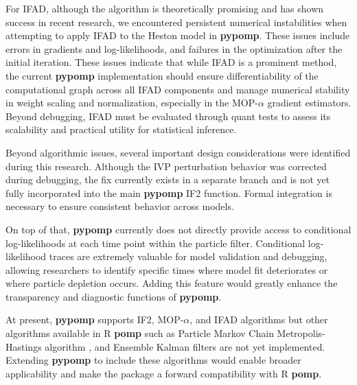 \documentclass[11pt]{report}
\begin{document}
For IFAD, although the algorithm is theoretically promising and has shown success in recent research, we encountered persistent numerical instabilities when attempting to apply IFAD to the Heston model in \textbf{pypomp}. These issues include errors in gradients and log-likelihoods, and failures in the optimization after the initial iteration. These issues indicate that while IFAD is a prominent method, the current \textbf{pypomp} implementation should ensure differentiability of the computational graph across all IFAD components and manage numerical stability in weight scaling and normalization, especially in the MOP-$\alpha$ gradient estimators. Beyond debugging, IFAD must be evaluated through quant tests to assess its scalability and practical utility for statistical inference.

Beyond algorithmic issues, several important design considerations were identified during this research. Although the IVP perturbation behavior was corrected during debugging, the fix currently exists in a separate branch and is not yet fully incorporated into the main \textbf{pypomp} IF2 function. Formal integration is necessary to ensure consistent behavior across models. 

On top of that, \textbf{pypomp} currently does not directly provide access to conditional log-likelihoods at each time point within the particle filter. Conditional log-likelihood traces are extremely valuable for model validation and debugging, allowing researchers to identify specific times where model fit deteriorates or where particle depletion occurs. Adding this feature would greatly enhance the transparency and diagnostic functions of \textbf{pypomp}.

At present, \textbf{pypomp} supports IF2, MOP-$\alpha$, and IFAD algorithms but other algorithms available in R \textbf{pomp} such as Particle Markov Chain Metropolis-Hastings algorithm \citep{andrieu2010particle}, and Ensemble Kalman filters \citep{evensen2003ensemble} are not yet implemented. Extending \textbf{pypomp} to include these algorithms would enable broader applicability and make the package a forward compatibility with R \textbf{pomp}.




\newpage


\renewcommand \bibname{Reference}


\vspace{1cm}
\normalsize
\end{document}
